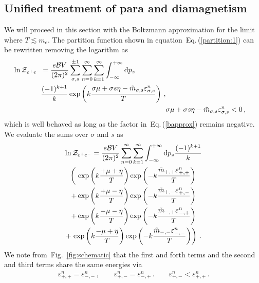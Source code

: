\documentclass[aps,prd,floatfix,reprint]{revtex4-2}
\newcommand{\req}[1]{Eq.\,(\ref{#1})}
\newcommand{\rf}[1]{Fig.~{\ref{#1}}}
\begin{document}
\subsection{Unified treatment of para and diamagnetism}
\label{sec:paradia}
\noindent We will proceed in this section with the Boltzmann approximation for the limit where $T\lesssim m_e$. The partition function shown in equation~\req{partition:1} can be rewritten removing the logarithm as
\begin{align}
\begin{split}
\label{partitionpower:1}
\ln{{\cal Z}_{e^{+}e^{-}}}&=\frac{e{\cal B}V}{(2\pi)^{2}}\sum_{\sigma,s}^{\pm1}\sum_{n=0}^{\infty}\sum_{k=1}^{\infty}\int_{-\infty}^{+\infty}{\rm d}p_{z}\\
&\frac{(-1)^{k+1}}{k}\exp\left({k\frac{\sigma\mu+\sigma s\eta-{\tilde m}_{\sigma,s}\varepsilon^{n}_{\sigma,s}}{T}}\right)\,, 
\end{split}\\
\label{bapprox} 
&\sigma\mu+\sigma s\eta-{\tilde m}_{\sigma,s}\varepsilon_{\sigma,s}^{n}<0\,,
\end{align}
which is well behaved as long as the factor in~\req{bapprox} remains negative. We evaluate the sums over $\sigma$ and $s$ as
\begin{multline}
 \label{partitionpower:2}
 \ln{{\cal Z}_{e^{+}e^{-}}}=\frac{e{\cal B}V}{(2\pi)^{2}}\sum_{n=0}^{\infty}\sum_{k=1}^{\infty}\int_{-\infty}^{+\infty}{\rm d}p_{z}\frac{(-1)^{k+1}}{k}\\
 \left(\ \exp\left(k\frac{+\mu+\eta}{T}\right)\exp\left(-k\frac{{\tilde m}_{+,+}\varepsilon_{+,+}^{n}}{T}\right)\right.\\
 +\exp\left(k\frac{+\mu-\eta}{T}\right)\exp\left(-k\frac{{\tilde m}_{+,-}\varepsilon_{+,-}^{n}}{T}\right)\\
 +\exp\left(k\frac{-\mu-\eta}{T}\right)\exp\left(-k\frac{{\tilde m}_{-,+}\varepsilon_{-,+}^{n}}{T}\right)\\
 +\left.\exp\left(k\frac{-\mu+\eta}{T}\right)\exp\left(-k\frac{{\tilde m}_{-,-}\varepsilon_{-,-}^{n}}{T}\right)\right)\,.
\end{multline}
We note from~\rf{fig:schematic} that the first and forth terms and the second and third terms share the same energies via
\begin{gather}
 \label{partitionpower:3}
 \varepsilon_{+,+}^{n}=\varepsilon_{-,-}^{n}\,,\qquad
 \varepsilon_{+,-}^{n}=\varepsilon_{-,+}^{n}\,.\qquad
 \varepsilon_{+,-}^{n}<\varepsilon_{+,+}^{n}\,.
\end{gather}
\end{document}
